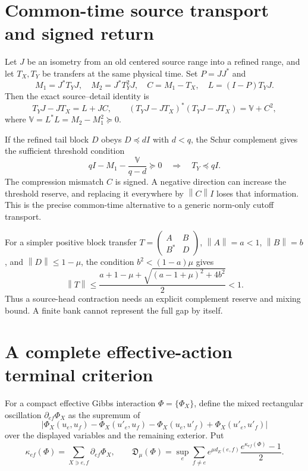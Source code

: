 \documentclass[11pt,oneside,openany]{book}
\theoremstyle{definition}
\theoremstyle{remark}
\newcommand{\norm}[1]{\left\lVert#1\right\rVert}
\begin{document}
\section{Common-time source transport and signed return}
Let $J$ be an isometry from an old centered source range into a refined range, and let $T_X,T_Y$ be transfers at the same physical time. Set $P=JJ^*$ and
\[
M_1=J^*T_YJ,\quad M_2=J^*T_Y^2J,\quad
C=M_1-T_X,\quad L=(I-P)T_YJ.
\]
Then the exact source--detail identity is
\begin{equation}\label{eq:transport-defect}
T_YJ-JT_X=L+JC,\qquad
(T_YJ-JT_X)^*(T_YJ-JT_X)=\mathbb V+C^2,
\end{equation}
where $\mathbb V=L^*L=M_2-M_1^2\succeq0$.

If the refined tail block $D$ obeys $D\preceq dI$ with $d<q$, the Schur complement gives the sufficient threshold condition
\begin{equation}\label{eq:transport-threshold}
qI-M_1-\frac{\mathbb V}{q-d}\succeq0
\quad\Longrightarrow\quad T_Y\preceq qI.
\end{equation}
The compression mismatch $C$ is signed. A negative direction can increase the threshold reserve, and replacing it everywhere by $\norm C I$ loses that information. This is the precise common-time alternative to a generic norm-only cutoff transport. \cite{GT}

For a simpler positive block transfer $T=\left(\begin{smallmatrix}A&B\\B^*&D\end{smallmatrix}\right)$, $\norm A=a<1$, $\norm B=b$, and $\norm D\le1-\mu$, the condition $b^2<(1-a)\mu$ gives
\begin{equation}\label{eq:2x2-transfer}
\norm T\le\frac{a+1-\mu+\sqrt{(a-1+\mu)^2+4b^2}}2<1.
\end{equation}
Thus a source-head contraction needs an explicit complement reserve and mixing bound. A finite bank cannot represent the full gap by itself.

\section{A complete effective-action terminal criterion}
For a compact effective Gibbs interaction $\Phi=\{\Phi_X\}$, define the mixed rectangular oscillation $\partial_{ef}\Phi_X$ as the supremum of
\[
|\Phi_X(u_e,u_f)-\Phi_X(u'_e,u_f)-\Phi_X(u_e,u'_f)+\Phi_X(u'_e,u'_f)|
\]
over the displayed variables and the remaining exterior. Put
\[
\kappa_{ef}(\Phi)=\sum_{X\ni e,f}\partial_{ef}\Phi_X,
\qquad
\mathfrak D_\mu(\Phi)=\sup_e\sum_{f\ne e}e^{\mu d_E(e,f)}
\frac{e^{\kappa_{ef}(\Phi)}-1}{2}.
\]
\end{document}
